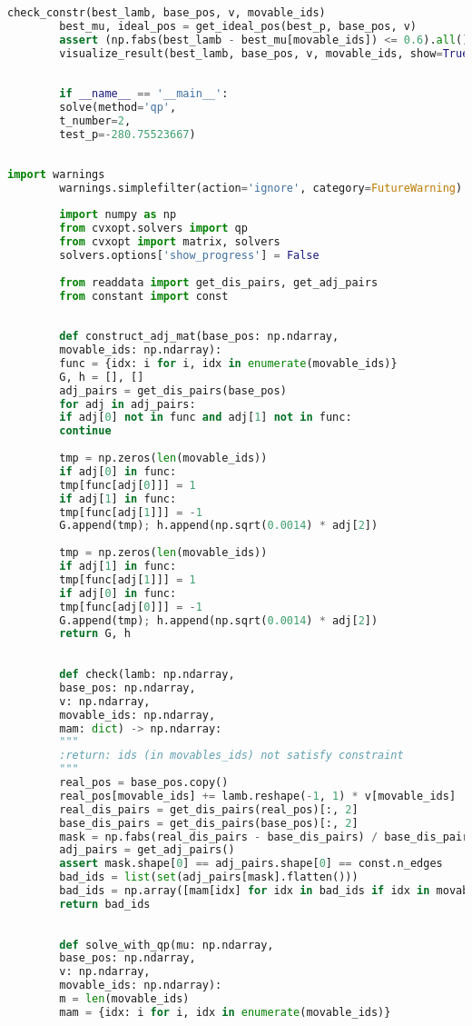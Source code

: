 \documentclass[withoutpreface,bwprint,fontset=macnew]{cumcmthesis} %
\begin{document}
\begin{appendices}
\begin{lstlisting}[language=python]
		check_constr(best_lamb, base_pos, v, movable_ids)
		best_mu, ideal_pos = get_ideal_pos(best_p, base_pos, v)
		assert (np.fabs(best_lamb - best_mu[movable_ids]) <= 0.6).all()
		visualize_result(best_lamb, base_pos, v, movable_ids, show=True, save=False, rotate=(t_number == 2))
		
		
		if __name__ == '__main__':
		solve(method='qp',
		t_number=2,
		test_p=-280.75523667)
		
	\end{lstlisting}

	\begin{lstlisting}[language=python]
		import warnings
		warnings.simplefilter(action='ignore', category=FutureWarning)
		
		import numpy as np
		from cvxopt.solvers import qp
		from cvxopt import matrix, solvers
		solvers.options['show_progress'] = False
		
		from readdata import get_dis_pairs, get_adj_pairs
		from constant import const
		
		
		def construct_adj_mat(base_pos: np.ndarray,
		movable_ids: np.ndarray):
		func = {idx: i for i, idx in enumerate(movable_ids)}
		G, h = [], []
		adj_pairs = get_dis_pairs(base_pos)
		for adj in adj_pairs:
		if adj[0] not in func and adj[1] not in func:
		continue
		
		tmp = np.zeros(len(movable_ids))
		if adj[0] in func:
		tmp[func[adj[0]]] = 1
		if adj[1] in func:
		tmp[func[adj[1]]] = -1
		G.append(tmp); h.append(np.sqrt(0.0014) * adj[2])
		
		tmp = np.zeros(len(movable_ids))
		if adj[1] in func:
		tmp[func[adj[1]]] = 1
		if adj[0] in func:
		tmp[func[adj[0]]] = -1
		G.append(tmp); h.append(np.sqrt(0.0014) * adj[2])
		return G, h
		
		
		def check(lamb: np.ndarray,
		base_pos: np.ndarray,
		v: np.ndarray,
		movable_ids: np.ndarray,
		mam: dict) -> np.ndarray:
		"""
		:return: ids (in movables_ids) not satisfy constraint
		"""
		real_pos = base_pos.copy()
		real_pos[movable_ids] += lamb.reshape(-1, 1) * v[movable_ids]
		real_dis_pairs = get_dis_pairs(real_pos)[:, 2]
		base_dis_pairs = get_dis_pairs(base_pos)[:, 2]
		mask = np.fabs(real_dis_pairs - base_dis_pairs) / base_dis_pairs > 0.0007
		adj_pairs = get_adj_pairs()
		assert mask.shape[0] == adj_pairs.shape[0] == const.n_edges
		bad_ids = list(set(adj_pairs[mask].flatten()))
		bad_ids = np.array([mam[idx] for idx in bad_ids if idx in movable_ids])
		return bad_ids
		
		
		def solve_with_qp(mu: np.ndarray,
		base_pos: np.ndarray,
		v: np.ndarray,
		movable_ids: np.ndarray):
		m = len(movable_ids)
		mam = {idx: i for i, idx in enumerate(movable_ids)}
		

\end{lstlisting}
\end{appendices}
\end{document}
